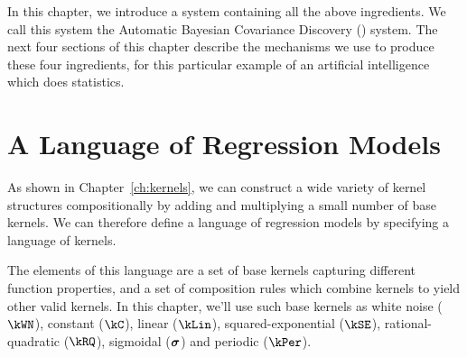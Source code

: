 In this chapter, we introduce a system containing all the above ingredients.
We call this system the Automatic Bayesian Covariance Discovery (\procedurename{}) system.
The next four sections of this chapter describe the mechanisms we use to produce these four ingredients, for this particular example of an artificial intelligence which does statistics.



\section{A Language of Regression Models}
\label{sec:improvements}

As shown in Chapter~\ref{ch:kernels}, we can construct a wide variety of kernel structures compositionally by adding and multiplying a small number of base kernels.
We can therefore define a language of regression models by specifying a language of kernels.

The elements of this language are a set of base kernels capturing different function properties, and a set of
composition rules which combine kernels to yield other valid kernels.
In this chapter, we'll use such base kernels as white noise ($\kWN$), constant ($\kC$), linear ($\kLin$), squared-exponential ($\kSE$), rational-quadratic ($\kRQ$), sigmoidal ($\boldsymbol\sigma$) and periodic ($\kPer$).

